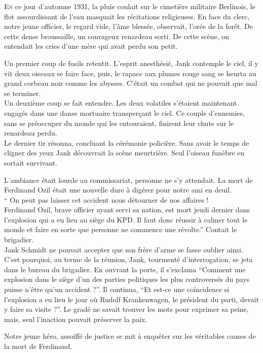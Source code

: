 \lettrine{E}{n} ce jour d'automne 1931, la pluie coulait sur le cimetière militaire Berlinois,
le flot assourdissant de l'eau masquait les récitations religieuses.
En face du clerc, notre jeune officier, le regard vide, l'âme blessée, observait, l'orée de la forêt. 
De cette dense broussaille, un courageux renardeau sorti.
De cette scène, on entendait les cries d'une mère qui avait perdu son petit.

Un premier coup de fusils retentit.
L'esprit anesthésié, Jank contemple le ciel, il y vit deux oiseaux se faire face, puis, le rapace aux plumes rouge sang se heurta au grand corbeau noir comme les abysses.
C'était un combat qui ne pouvait que mal se terminer.\\
Un deuxième coup se fait entendre.
Les deux volatiles s'étaient maintenant engagés dans une danse mortuaire transperçant le ciel.
Ce couple d'ennemies, sans se préoccuper du monde qui les entouraient, finirent leur chute sur le renardeau perdu.\\
Le dernier tir résonna, concluant la cérémonie policière.
Sans avoir le temps de cligner des yeux Jank découvrait la scène meurtrière.
Seul l'oiseau funèbre en sortait survivant.

L'ambiance était lourde au commissariat, personne ne s'y attendait.
La mort de Ferdinand Ozil était une nouvelle dure à digérer pour notre ami en deuil.\\
\enquote{%
    On peut pas laisser cet accident nous détourner de nos affaires !\\
    Ferdinand Ozil, brave officier ayant servi sa nation, est mort jeudi dernier dans l'explosion qui a eu lieu au siège du KPD.
    Il faut donc réussir à calmer tout le monde et faire en sorte que personne ne commence une révolte.}
Contait le brigadier.\\
Jank Schmidt ne pouvait accepter que son frère d'arme se fasse oublier ainsi.
C'est pourquoi, au terme de la réunion, Jank, tourmenté d'interrogation, se jeta dans le bureau du brigadier.
En ouvrant la porte, il s'exclama
\enquote{Comment une explosion dans le siège d'un des parties politiques les plus controversés du pays puisse n'être qu'un accident ?}.
Il continua,
\enquote{Et est-ce une coïncidence si l'explosion a eu lieu le jour où Rudolf Krankenwagen, le président du parti, devait y faire sa visite ?}.
Le gradé ne savait trouver les mots pour exprimer sa peine, mais, seul l'inaction pouvait préserver la paix.

Notre jeune héro, assoiffé de justice se mit à enquêter sur les véritables causes de la mort de Ferdinand.

